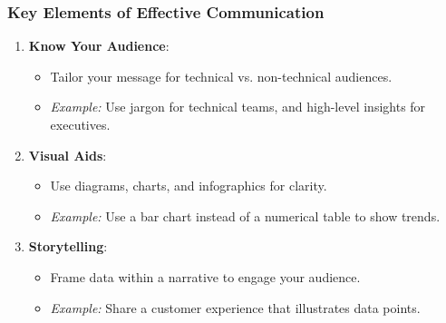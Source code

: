 \documentclass[aspectratio=169]{beamer}
\begin{document}
\begin{frame}[fragile]
    \frametitle{Key Elements of Effective Communication}
    \begin{enumerate}
        \item \textbf{Know Your Audience}:
            \begin{itemize}
                \item Tailor your message for technical vs. non-technical audiences.
                \item \textit{Example:} Use jargon for technical teams, and high-level insights for executives.
            \end{itemize}
        \item \textbf{Visual Aids}:
            \begin{itemize}
                \item Use diagrams, charts, and infographics for clarity.
                \item \textit{Example:} Use a bar chart instead of a numerical table to show trends.
            \end{itemize}
        \item \textbf{Storytelling}:
            \begin{itemize}
                \item Frame data within a narrative to engage your audience.
                \item \textit{Example:} Share a customer experience that illustrates data points.
            \end{itemize}
    \end{enumerate}
\end{frame}
\end{document}
